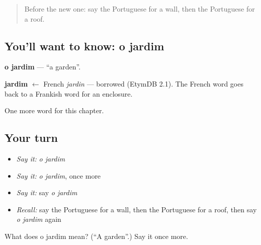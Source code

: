 \begin{quote}
Before the new one: say the Portuguese for a wall, then the Portuguese for a roof.
\end{quote}

\subsection*{You'll want to know: o jardim}
\textbf{o jardim} — \textquotedblleft{}a garden\textquotedblright{}.

\begin{cousinweb}
\textbf{jardim} $\leftarrow$ French \emph{jardin} — borrowed (EtymDB 2.1). The French word goes back to a Frankish word for an enclosure.
\end{cousinweb}

\begin{grammarlens}[title={What you've built}]
One more word for this chapter.
\end{grammarlens}

\subsection*{Your turn}
\begin{itemize}
\raggedright
  \item \emph{Say it:} \emph{o jardim}
  \item \emph{Say it:} \emph{o jardim}, once more
  \item \emph{Say it:} say \emph{o jardim}
  \item \emph{Recall:} say the Portuguese for a wall, then the Portuguese for a roof, then say \emph{o jardim} again
\end{itemize}

\begin{tcolorbox}[breakable,colback=teal!4,colframe=teal!35!black,title={Before you move on}]
What does o jardim mean? (\textquotedblleft{}A garden\textquotedblright{}.) Say it once more.
\end{tcolorbox}
